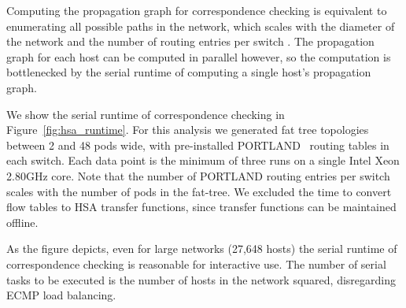 {%

 Computing the propagation
graph for correspondence checking is equivalent to enumerating
all possible paths in the network, which scales with the diameter
of the network and the number of routing entries per switch .
The propagation graph for each host can be
computed in parallel however, so the computation is bottlenecked by the serial runtime
of computing a single host's propagation graph.

We show the serial runtime of correspondence checking in
Figure~\ref{fig:hsa_runtime}. For this analysis we generated fat tree topologies
between 2 and 48 pods wide, with pre-installed PORTLAND~\cite{NiranjanMysore:2009:PSF:1592568.1592575}
routing tables in each switch. Each data point is the minimum of three
runs on a single Intel Xeon 2.80GHz core. Note that the number of PORTLAND routing entries per switch scales with the number
of pods in the fat-tree. We excluded the time to convert
flow tables to HSA transfer functions, since transfer functions can be maintained
offline.



As the figure depicts, even for large networks
(27,648 hosts) the serial runtime of correspondence checking is reasonable for
interactive use. The number of serial tasks to be executed
is the number of hosts in the network squared, disregarding ECMP load balancing.

}
